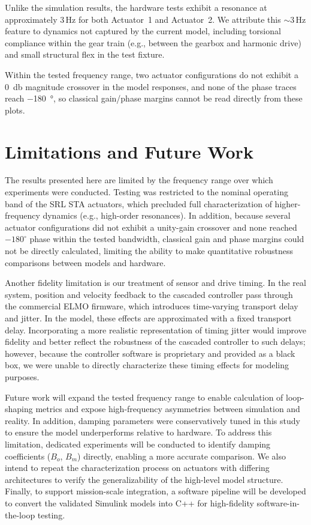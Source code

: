 \documentclass[twocolumn,letterpaper]{IEEEAerospaceCLS}  %
\begin{document}
Unlike the simulation results, the hardware tests exhibit a resonance at approximately $3\,\text{Hz}$ for both Actuator~1 and Actuator~2. We attribute this $\sim 3\,\text{Hz}$ feature to dynamics not captured by the current model, including torsional compliance within the gear train (e.g., between the gearbox and harmonic drive) and small structural flex in the test fixture.

Within the tested frequency range, two actuator configurations do not exhibit a \SI{0}{\decibel} magnitude crossover in the model responses, and none of the phase traces reach \SI{-180}{\degree}, so classical gain/phase margins cannot be read directly from these plots.




\section{Limitations and Future Work}
The results presented here are limited by the frequency range over which experiments were conducted. Testing was restricted to the nominal operating band of the SRL STA actuators, which precluded full characterization of higher-frequency dynamics (e.g., high-order resonances). In addition, because several actuator configurations did not exhibit a unity-gain crossover and none reached $-180^\circ$ phase within the tested bandwidth, classical gain and phase margins could not be directly calculated, limiting the ability to make quantitative robustness comparisons between models and hardware.

Another fidelity limitation is our treatment of sensor and drive timing. In the real system, position and velocity feedback to the cascaded controller pass through the commercial ELMO firmware, which introduces time-varying transport delay and jitter. In the model, these effects are approximated with a fixed transport delay. Incorporating a more realistic representation of timing jitter would improve fidelity and better reflect the robustness of the cascaded controller to such delays; however, because the controller software is proprietary and provided as a black box, we were unable to directly characterize these timing effects for modeling purposes.

Future work will expand the tested frequency range to enable calculation of loop-shaping metrics and expose high-frequency asymmetries between simulation and reality. In addition, damping parameters were conservatively tuned in this study to ensure the model underperforms relative to hardware. To address this limitation, dedicated experiments will be conducted to identify damping coefficients ($B_o$, $B_m$) directly, enabling a more accurate comparison. We also intend to repeat the characterization process on actuators with differing architectures to verify the generalizability of the high-level model structure. Finally, to support mission-scale integration, a software pipeline will be developed to convert the validated Simulink models into C++ for high-fidelity software-in-the-loop testing.
\end{document}
